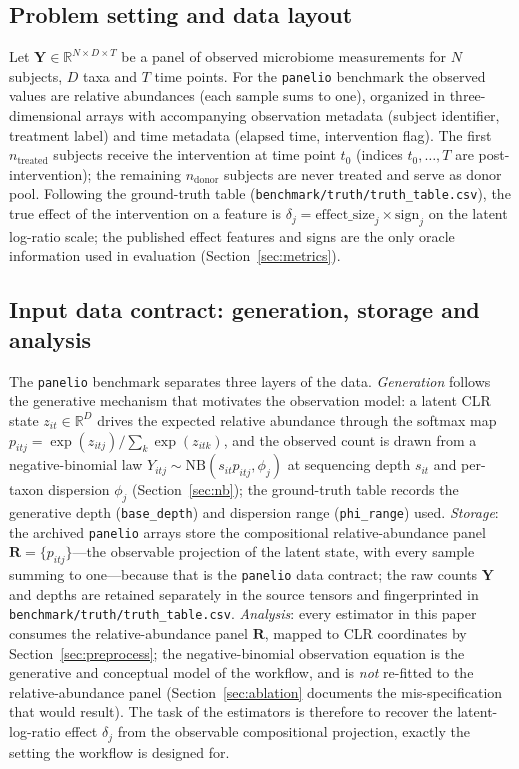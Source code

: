 \documentclass[11pt]{article}
\begin{document}
\subsection{Problem setting and data layout}\label{sec:setting}

Let $\mathbf{Y}\in\mathbb{R}^{N\times D\times T}$ be a panel of observed microbiome measurements for
$N$ subjects, $D$ taxa and $T$ time points. For the \texttt{panelio} benchmark the observed values
are relative abundances (each sample sums to one), organized in three-dimensional arrays with
accompanying observation metadata (subject identifier, treatment label) and time metadata (elapsed
time, intervention flag). The first $n_{\text{treated}}$ subjects receive the intervention at time
point $t_0$ (indices $t_0,\dots,T$ are post-intervention); the remaining $n_{\text{donor}}$ subjects
are never treated and serve as donor pool. Following the ground-truth table
(\texttt{benchmark/truth/truth\_table.csv}), the true effect of the intervention on a feature is
$\delta_j = \mathrm{effect\_size}_j \times \mathrm{sign}_j$ on the latent log-ratio scale; the
published effect features and signs are the only oracle information used in evaluation
(Section~\ref{sec:metrics}).

\subsection{Input data contract: generation, storage and analysis}\label{sec:input}

The \texttt{panelio} benchmark separates three layers of the data. \emph{Generation} follows the
generative mechanism that motivates the observation model: a latent CLR state
$z_{it}\in\mathbb{R}^{D}$ drives the expected relative abundance through the softmax map
$p_{itj}=\exp(z_{itj})/\sum_k\exp(z_{itk})$, and the observed count is drawn from a negative-binomial
law $Y_{itj}\sim\mathrm{NB}(s_{it}p_{itj},\phi_j)$ at sequencing depth $s_{it}$ and per-taxon
dispersion $\phi_j$ (Section~\ref{sec:nb}); the ground-truth table records the generative depth
(\texttt{base\_depth}) and dispersion range (\texttt{phi\_range}) used. \emph{Storage}: the archived
\texttt{panelio} arrays store the compositional relative-abundance panel
$\mathbf{R}=\{p_{itj}\}$---the observable projection of the latent state, with every sample summing
to one---because that is the \texttt{panelio} data contract; the raw counts $\mathbf{Y}$ and depths
are retained separately in the source tensors and fingerprinted in
\texttt{benchmark/truth/truth\_table.csv}. \emph{Analysis}: every estimator in this paper consumes
the relative-abundance panel $\mathbf{R}$, mapped to CLR coordinates by
Section~\ref{sec:preprocess}; the negative-binomial observation equation is the generative and
conceptual model of the workflow, and is \emph{not} re-fitted to the relative-abundance panel
(Section~\ref{sec:ablation} documents the mis-specification that would result). The task of the
estimators is therefore to recover the latent-log-ratio effect $\delta_j$ from the observable
compositional projection, exactly the setting the workflow is designed for.
\end{document}
